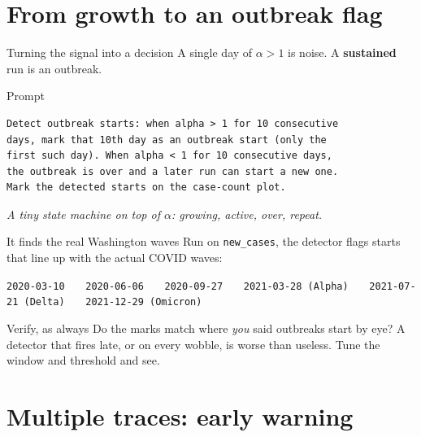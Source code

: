 \documentclass[aspectratio=169,11pt]{beamer}
\begin{document}
\section{From growth to an outbreak flag}

\begin{frame}[fragile]{Turning the signal into a decision}
  A single day of $\alpha>1$ is noise. A \textbf{sustained} run is an outbreak.
  \begin{block}{Prompt}
  \begin{lstlisting}
Detect outbreak starts: when alpha > 1 for 10 consecutive
days, mark that 10th day as an outbreak start (only the
first such day). When alpha < 1 for 10 consecutive days,
the outbreak is over and a later run can start a new one.
Mark the detected starts on the case-count plot.
  \end{lstlisting}
  \end{block}
  \begin{center}
    \itshape A tiny state machine on top of $\alpha$: growing, active, over, repeat.
  \end{center}
\end{frame}

\begin{frame}{It finds the real Washington waves}
  Run on \texttt{new\_cases}, the detector flags starts that line up with the actual COVID
  waves:
  \begin{center}
  \footnotesize
  \texttt{2020-03-10} \ \textbullet\ \ \texttt{2020-06-06} \ \textbullet\ \
  \texttt{2020-09-27} \ \textbullet\ \ \texttt{2021-03-28 (Alpha)} \ \textbullet\ \
  \texttt{2021-07-21 (Delta)} \ \textbullet\ \ \texttt{2021-12-29 (Omicron)}
  \end{center}
  \vspace{0.4em}
  \begin{alertblock}{Verify, as always}
    Do the marks match where \emph{you} said outbreaks start by eye? A detector that fires
    late, or on every wobble, is worse than useless. Tune the window and threshold and see.
  \end{alertblock}
\end{frame}

\section{Multiple traces: early warning}
\end{document}
